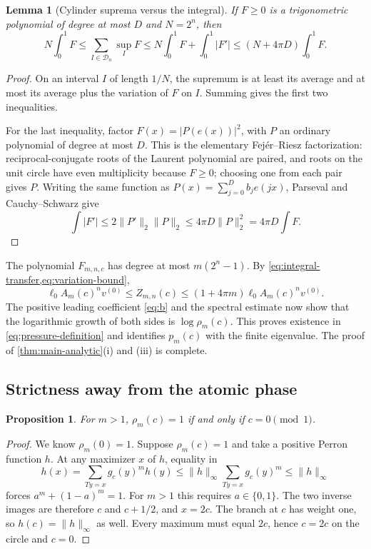 \documentclass[11pt,a4paper]{article}
\numberwithin{equation}{section}
\newtheorem{lemma}[lemma]{Lemma}
\newtheorem{proposition}[proposition]{Proposition}
\theoremstyle{definition}
\theoremstyle{remark}
\begin{document}
\begin{lemma}[Cylinder suprema versus the integral]
\label{lem:variation}
If $F\geq0$ is a trigonometric polynomial of degree at most $D$ and
$N=2^n$, then
\begin{equation}
 N\int_0^1F\leq\sum_{I\in\mathcal D_n}\sup_I F
 \leq N\int_0^1F+\int_0^1|F'|
 \leq(N+4\pi D)\int_0^1F.
 \label{eq:variation-bound}
\end{equation}
\end{lemma}
\begin{proof}
On an interval $I$ of length $1/N$, the supremum is at least its average
and at most its average plus the variation of $F$ on $I$. Summing gives
the first two inequalities.

For the last inequality, factor $F(x)=|P(e(x))|^2$, with $P$ an ordinary
polynomial of degree at most $D$. This is the elementary
Fej\'er--Riesz factorization: reciprocal-conjugate roots of the Laurent
polynomial are paired, and roots on the unit circle have even
multiplicity because $F\geq0$; choosing one from each pair gives $P$.
Writing the same function as $P(x)=\sum_{j=0}^D b_je(jx)$,
Parseval and Cauchy--Schwarz give
\[
 \int|F'|\leq2\|P'\|_2\|P\|_2
 \leq4\pi D\|P\|_2^2=4\pi D\int F.
\]
\end{proof}

The polynomial $F_{m,n,c}$ has degree at most $m(2^n-1)$.
By \cref{eq:integral-transfer,eq:variation-bound},
\begin{equation}
 \ell_0A_m(c)^nv^{(0)}\leq Z_{m,n}(c)
 \leq(1+4\pi m)\ell_0A_m(c)^nv^{(0)}.
 \label{eq:pressure-sandwich}
\end{equation}
The positive leading coefficient \cref{eq:b} and the spectral estimate
now show that the logarithmic growth of both sides is $\log\rho_m(c)$.
This proves existence in \cref{eq:pressure-definition} and identifies
$p_m(c)$ with the finite eigenvalue. The proof of
\cref{thm:main-analytic}(i) and (iii) is complete.

\subsection{Strictness away from the atomic phase}
\begin{proposition}
\label{prop:strict}
For $m>1$, $\rho_m(c)=1$ if and only if $c=0\pmod1$.
\end{proposition}
\begin{proof}
We know $\rho_m(0)=1$. Suppose $\rho_m(c)=1$ and take a positive
Perron function $h$. At any maximizer $x$ of $h$, equality in
\[
 h(x)=\sum_{Ty=x}g_c(y)^mh(y)
 \leq\|h\|_\infty\sum_{Ty=x}g_c(y)^m
 \leq\|h\|_\infty
\]
forces $a^m+(1-a)^m=1$. For $m>1$ this requires $a\in\{0,1\}$.
The two inverse images are therefore $c$ and $c+1/2$, and $x=2c$.
The branch at $c$ has weight one, so $h(c)=\|h\|_\infty$ as well.
Every maximum must equal $2c$, hence $c=2c$ on the circle and $c=0$.
\end{proof}
\end{document}
